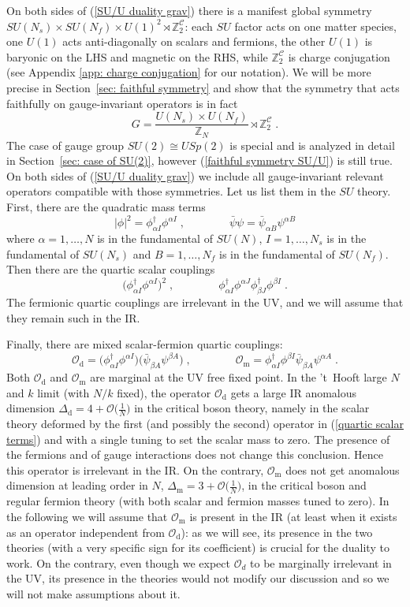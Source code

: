 \documentclass[a4paper, 12pt]{article}
\numberwithin{equation}{section}
\newcommand{\be}{\begin{equation}} \newcommand{\ee}{\end{equation}}
\newcommand{\cC}{\mathcal{C}}
\newcommand{\cO}{\mathcal{O}}
\newcommand{\bZ}{\mathbb{Z}}
\begin{document}
On both sides of (\ref{SU/U duality grav}) there is a manifest global symmetry $SU(N_s) \times SU(N_f) \times U(1)^2 \rtimes \bZ_2^\cC$: each $SU$ factor acts on one matter species, one $U(1)$ acts anti-diagonally on scalars and fermions, the other $U(1)$ is baryonic on the LHS and magnetic on the RHS, while $\bZ_2^\cC$ is charge conjugation (see Appendix \ref{app: charge conjugation} for our notation). We will be more precise in Section~\ref{sec: faithful symmetry} and show that the symmetry that acts faithfully on gauge-invariant operators is in fact
\be
\label{faithful symmetry SU/U}
G = \frac{U(N_s) \times U(N_f)}{\bZ_N} \rtimes \bZ_2^\cC \;.
\ee
The case of gauge group $SU(2) \cong USp(2)$ is special and is analyzed in detail in Section~\ref{sec: case of SU(2)}, however (\ref{faithful symmetry SU/U}) is still true. On both sides of (\ref{SU/U duality grav}) we include all gauge-invariant relevant operators compatible with those symmetries. Let us list them in the $SU$ theory. First, there are the quadratic mass terms
\be
\label{mass terms}
|\phi|^2 = \phi^\dag_{\alpha I} \phi^{\alpha I} \;,\qquad\qquad \bar\psi\psi = \bar\psi_{\alpha B} \psi^{\alpha B}
\ee
where $\alpha=1,\dots,N$ is in the fundamental of $SU(N)$, $I=1,\dots, N_s$ is in the fundamental of $SU(N_s)$ and $B=1,\dots, N_f$ is in the fundamental of $SU(N_f)$. Then there are the quartic scalar couplings
\be
\label{quartic scalar terms}
\big( \phi^\dag_{\alpha I} \phi^{\alpha I} \big)^2 \;,\qquad\qquad \phi^\dag_{\alpha I} \phi^{\alpha J} \phi^\dag_{\beta J} \phi^{\beta I} \;.
\ee
The fermionic quartic couplings are irrelevant in the UV, and we will assume that they remain such in the IR.

Finally, there are mixed scalar-fermion quartic couplings:
\be
\label{def mixed couplings}
\cO_\text{d} = \big( \phi^\dag_{\alpha I} \phi^{\alpha I} \big) \big( \bar\psi_{\beta A} \psi^{\beta A} \big) \;,\qquad\qquad \cO_\text{m} = \phi^\dag_{\alpha I} \phi^{\beta I} \bar\psi_{
\beta A} \psi^{\alpha A} \;.
\ee
Both $\cO_\text{d}$ and $\cO_\text{m}$ are marginal at the UV free fixed point. In the 't~Hooft large $N$ and $k$ limit (with $N/k$ fixed), the operator $\cO_\text{d}$ gets a large IR anomalous dimension $\Delta_\text{d} = 4 + \cO\big( \frac 1N \big)$ in the critical boson theory, namely in the scalar theory deformed by the first (and possibly the second) operator in (\ref{quartic scalar terms}) and with a single tuning to set the scalar mass to zero. The presence of the fermions and of gauge interactions does not change this conclusion. Hence this operator is irrelevant in the IR. On the contrary, $\cO_\text{m}$ does not get anomalous dimension at leading order in $N$, $\Delta_\text{m} = 3 + \cO\big( \frac 1N \big)$, in the critical boson and regular fermion theory (with both scalar and fermion masses tuned to zero). In the following we will assume that $\cO_\text{m}$ is present in the IR (at least when it exists as an operator independent from $\cO_\text{d}$): as we will see, its presence in the two theories (with a very specific sign for its coefficient) is crucial for the duality to work. On the contrary, even though we expect $\cO_d$ to be marginally irrelevant in the UV, its presence in the theories would not modify our discussion and so we will not make assumptions about it.
\end{document}
